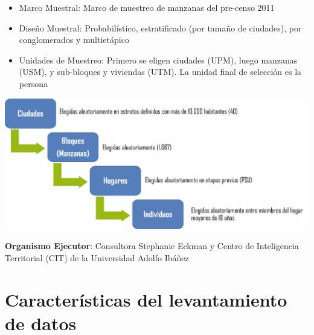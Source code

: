 \documentclass[
  12pt,
]{book}
\begin{document}
\begin{itemize}
\item
  Marco Muestral: Marco de muestreo de manzanas del pre-censo 2011
\item
  Diseño Muestral: Probabilístico, estratificado (por tamaño de ciudades), por conglomerados y multietápico
\item
  Unidades de Muestreo: Primero se eligen ciudades (UPM), luego manzanas (USM), y sub-bloques y viviendas (UTM). La unidad final de selección es la persona
\end{itemize}

\includegraphics[width=25.24in]{1_input/imagenes/etapas_seleccion}

\textbf{Organismo Ejecutor}: Consultora Stephanie Eckman y Centro de Inteligencia Territorial (CIT) de la Universidad Adolfo Ibáñez

\hypertarget{caracteruxedsticas-del-levantamiento-de-datos}{%
\section{Características del levantamiento de datos}\label{caracteruxedsticas-del-levantamiento-de-datos}}
\end{document}
